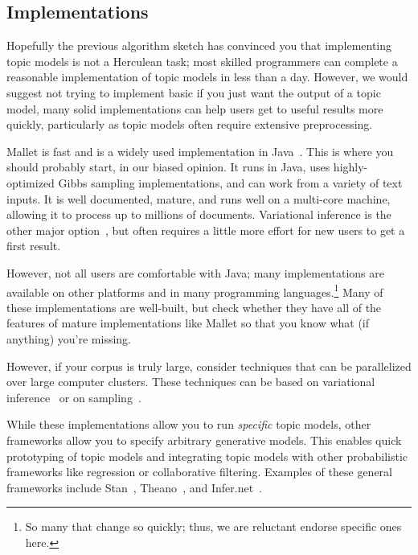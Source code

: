 \subsection{Implementations}

Hopefully the previous algorithm sketch has convinced you that implementing
topic models is not a Herculean task; most skilled programmers can complete a
reasonable implementation of topic models in less than a day.  However, we would
suggest not trying to implement basic  if you just want the
output of a topic model, many solid
implementations can help users get to useful results more quickly, particularly
as topic models often require extensive preprocessing.

Mallet is fast and is a widely used implementation in Java~\citep{mallet}.  This
is where you should probably start, in our biased opinion.  It runs in Java, uses
highly-optimized Gibbs sampling implementations, and can work from a variety of
text inputs.  It is well documented, mature, and runs well on a multi-core
machine, allowing it to process up to millions of documents.  Variational
inference is the other major option~\citep{blei-03,vw}, but often requires a
little more effort for new users to get a first result.

However, not all users are comfortable with Java; many
implementations are available on other platforms and in many programming
languages.\footnote{So many that change so quickly; thus, we are reluctant endorse specific ones here.}  Many of these
implementations are well-built, but check
whether they have all of the features of mature implementations like
Mallet so that you know what (if anything) you're missing.

However, if your corpus is truly large, consider techniques that can be parallelized over large computer
clusters.  These techniques can be based on variational
inference~\citep{Narayanamurthy-11,zhai-12} or on
sampling~\citep{newman-08}.

While these implementations allow you to run \emph{specific} topic
models, other frameworks allow you to specify arbitrary generative
models.  This enables quick prototyping of topic models and
integrating topic models with other probabilistic frameworks like
regression or collaborative filtering.  Examples of these general
frameworks include Stan~\citep{stan-software:2014},
Theano~\citep{theano}, and Infer.net~\citep{InferNET14}.

